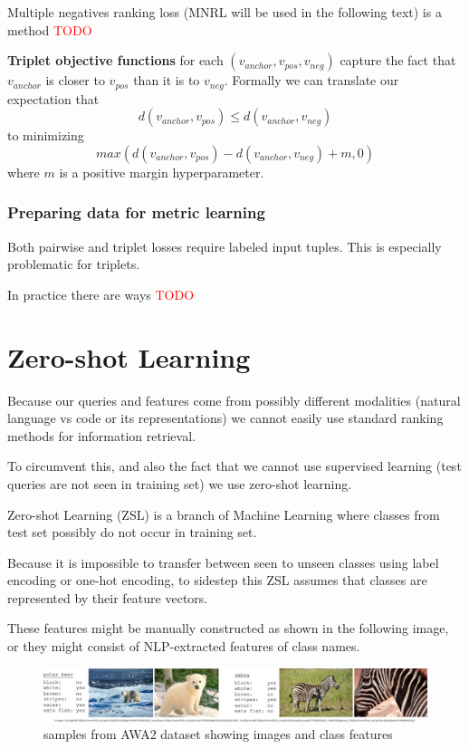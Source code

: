 \documentclass[longabstract,mgr,english]{iithesis}
\newcommand{\TODO}{\textcolor{red}{\huge{TODO}}}
\begin{document}
Multiple negatives ranking loss (MNRL will be used in the following text) is a method  \TODO

\textbf{Triplet objective functions} for each $(v_{anchor}, v_{pos}, v_{neg})$ capture the fact that $v_{anchor}$ is closer to $v_{pos}$ than it is to $v_{neg}$.
Formally we can translate our expectation that $$d(v_{anchor}, v_{pos})\leq d( v_{anchor}, v_{neg})$$ to minimizing $$max(d(v_{anchor}, v_{pos}) - d( v_{anchor}, v_{neg}) + m, 0)$$ where $m$ is a positive margin hyperparameter.

\subsubsection{Preparing data for metric learning}\label{metric_learning_data}

Both pairwise and triplet losses require labeled input tuples. This is especially problematic for triplets.

In practice there are ways \TODO

\section{Zero-shot Learning}

Because our queries and features come from possibly different modalities (natural language vs code or its representations) we cannot easily use standard ranking methods for information retrieval.

To circumvent this, and also the fact that we cannot use supervised learning (test queries are not seen in training set) we use zero-shot learning.

Zero-shot Learning (ZSL) is a branch of Machine Learning where classes from test set possibly do not occur in training set.

Because it is impossible to transfer between seen to unseen classes using label encoding or one-hot encoding, to sidestep this ZSL assumes that classes are represented by their feature vectors.

These features might be manually constructed as shown in the following image, or they might consist of NLP-extracted features of class names.


\begin{figure}[htbp]
\centering
\includegraphics[width=.9\linewidth]{./img/awa2.jpg}
\caption{samples from AWA2 dataset showing images and class features}
\end{figure}
\end{document}
